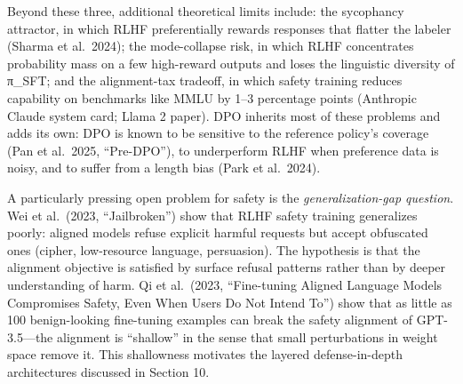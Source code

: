 \documentclass{article}
\begin{document}
Beyond these three, additional theoretical limits include: the sycophancy attractor, in which RLHF preferentially rewards responses that flatter the labeler (Sharma et al.~2024); the mode-collapse risk, in which RLHF concentrates probability mass on a few high-reward outputs and loses the linguistic diversity of π\_SFT; and the alignment-tax tradeoff, in which safety training reduces capability on benchmarks like MMLU by 1--3 percentage points (Anthropic Claude system card; Llama 2 paper). DPO inherits most of these problems and adds its own: DPO is known to be sensitive to the reference policy's coverage (Pan et al.~2025, ``Pre-DPO''), to underperform RLHF when preference data is noisy, and to suffer from a length bias (Park et al.~2024).

A particularly pressing open problem for safety is the \emph{generalization-gap question}. Wei et al.~(2023, ``Jailbroken'') show that RLHF safety training generalizes poorly: aligned models refuse explicit harmful requests but accept obfuscated ones (cipher, low-resource language, persuasion). The hypothesis is that the alignment objective is satisfied by surface refusal patterns rather than by deeper understanding of harm. Qi et al.~(2023, ``Fine-tuning Aligned Language Models Compromises Safety, Even When Users Do Not Intend To'') show that as little as 100 benign-looking fine-tuning examples can break the safety alignment of GPT-3.5---the alignment is ``shallow'' in the sense that small perturbations in weight space remove it. This shallowness motivates the layered defense-in-depth architectures discussed in Section 10.
\end{document}
